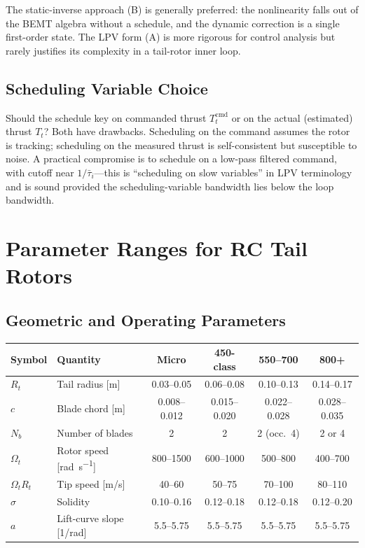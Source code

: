 \documentclass[11pt,a4paper]{article}
\newcommand{\OmegaT}{\Omega_t}
\newcommand{\Rt}{R_t}
\newcommand{\Tt}{T_t}
\newcommand{\Tcmd}{T_t^{\text{cmd}}}
\begin{document}
The static-inverse approach (B) is generally preferred: the nonlinearity falls
out of the BEMT algebra without a schedule, and the dynamic correction is a
single first-order state. The LPV form (A) is more rigorous for control analysis
but rarely justifies its complexity in a tail-rotor inner loop.

\subsection{Scheduling Variable Choice}

Should the schedule key on commanded thrust \(\Tcmd\) or on the actual
(estimated) thrust \(\Tt\)? Both have drawbacks. Scheduling on the command
assumes the rotor is tracking; scheduling on the measured thrust is
self-consistent but susceptible to noise. A practical compromise is to schedule
on a low-pass filtered command, with cutoff near \(1/\bar{\tau}_i\)---this is
``scheduling on slow variables'' in LPV terminology and is sound provided the
scheduling-variable bandwidth lies below the loop bandwidth.

\section{Parameter Ranges for RC Tail Rotors}

\subsection{Geometric and Operating Parameters}

\begin{center}
\renewcommand{\arraystretch}{1.15}
\begin{tabular}{llcccc}
\toprule
Symbol & Quantity & Micro & 450-class & 550--700 & 800+ \\
\midrule
\(\Rt\) & Tail radius [m]      & 0.03--0.05  & 0.06--0.08  & 0.10--0.13  & 0.14--0.17 \\
\(c\)    & Blade chord [m]       & 0.008--0.012 & 0.015--0.020 & 0.022--0.028 & 0.028--0.035 \\
\(N_b\)  & Number of blades       & 2 & 2 & 2 (occ.\ 4) & 2 or 4 \\
\(\OmegaT\) & Rotor speed [\si{\radian\per\second}] & 800--1500 & 600--1000 & 500--800 & 400--700 \\
\(\OmegaT\Rt\) & Tip speed [m/s] & 40--60 & 50--75 & 70--100 & 80--110 \\
\(\sigma\) & Solidity              & 0.10--0.16 & 0.12--0.18 & 0.12--0.18 & 0.12--0.20 \\
\(a\)    & Lift-curve slope [1/rad] & 5.5--5.75 & 5.5--5.75 & 5.5--5.75 & 5.5--5.75 \\
\bottomrule
\end{tabular}
\end{center}
\end{document}
